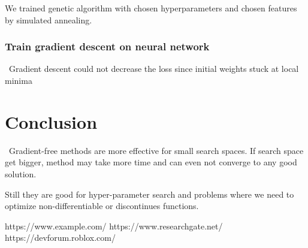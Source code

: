 \documentclass[conference]{IEEEtran}
\begin{document}
We trained genetic algorithm with chosen hyperparameters and chosen features by simulated annealing. 

\subsubsection{Train gradient descent on neural network}
\ 
Gradient descent could not decrease the loss since initial weights stuck at local minima

\section{Conclusion}
\ 
Gradient-free methods are more effective for small search spaces. If search space get bigger, method may take more time and can even not converge to any good solution. 

Still they are good for hyper-parameter search and problems where we need to optimize non-differentiable or discontinues functions.

\begin{thebibliography}{00}
 https://www.example.com/
\bibitem{b2} https://www.researchgate.net/
\bibitem{b4} https://devforum.roblox.com/
\end{thebibliography}
\end{document}
